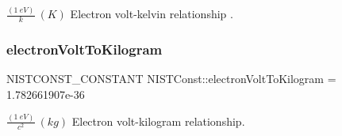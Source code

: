 $\frac{(1\ eV)}{k} \ (K)$ Electron volt-\/kelvin relationship . \mbox{\label{group___n_i_s_t_const-_electron_volt_gac875b0f36fd52d70256d4a3d86eebb2e}} 
\subsubsection{\texorpdfstring{electron\+Volt\+To\+Kilogram}{electronVoltToKilogram}}
{\footnotesize\ttfamily N\+I\+S\+T\+C\+O\+N\+S\+T\+\_\+\+C\+O\+N\+S\+T\+A\+NT N\+I\+S\+T\+Const\+::electron\+Volt\+To\+Kilogram = 1.\+782661907e-\/36}

$\frac{(1\ eV)}{c^2} \ (kg)$ Electron volt-\/kilogram relationship. 